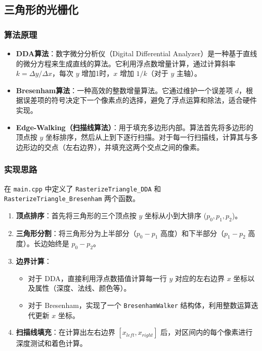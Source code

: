 \documentclass[a4paper]{article}
\begin{document}
\subsection{三角形的光栅化}

\subsubsection{算法原理}
\begin{itemize}
    \item \textbf{DDA算法}：数字微分分析仪（Digital Differential Analyzer）是一种基于直线的微分方程来生成直线的算法。它利用浮点数增量计算，通过计算斜率 $k = \Delta y / \Delta x$，每次 $y$ 增加1时，$x$ 增加 $1/k$（对于 $y$ 主轴）。
    \item \textbf{Bresenham算法}：一种高效的整数增量算法。它通过维护一个误差项 $d$，根据误差项的符号决定下一个像素点的选择，避免了浮点运算和除法，适合硬件实现。
    \item \textbf{Edge-Walking（扫描线算法）}：用于填充多边形内部。算法首先将多边形的顶点按 $y$ 坐标排序，然后从上到下逐行扫描。对于每一行扫描线，计算其与多边形边的交点（左右边界），并填充这两个交点之间的像素。
\end{itemize}

\subsubsection{实现思路}
在 \texttt{main.cpp} 中定义了 \texttt{RasterizeTriangle\_DDA} 和 \texttt{RasterizeTriangle\_Bresenham} 两个函数。
\begin{enumerate}
    \item \textbf{顶点排序}：首先将三角形的三个顶点按 $y$ 坐标从小到大排序 ($p_0, p_1, p_2$)。
    \item \textbf{三角形分割}：将三角形分为上半部分（$p_0-p_1$ 高度）和下半部分（$p_1-p_2$ 高度）。长边始终是 $p_0-p_2$。
    \item \textbf{边界计算}：
    \begin{itemize}
        \item 对于 DDA，直接利用浮点数插值计算每一行 $y$ 对应的左右边界 $x$ 坐标以及属性（深度、法线、颜色等）。
        \item 对于 Bresenham，实现了一个 \texttt{BresenhamWalker} 结构体，利用整数运算迭代更新 $x$ 坐标。
    \end{itemize}
    \item \textbf{扫描线填充}：在计算出左右边界 $[x_{left}, x_{right}]$ 后，对区间内的每个像素进行深度测试和着色计算。
\end{enumerate}
\end{document}
